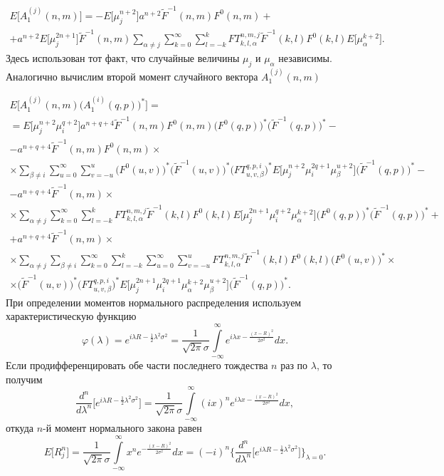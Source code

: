 \begin{multline}
E\bigg[A_1^{(j)}(n,m)\bigg]=-E\Big[\mu_j^{n+2}\Big] a^{n+2} \tilde F^{-1}(n,m)F^0(n,m)+ \\
+a^{n+2}E\Big[\mu_j^{2n+1}\Big]\tilde F^{-1}(n,m)\sum_{\alpha\neq j}\sum_{k=0}^\infty\sum_{l=-k}^k FT_{k,l,\alpha}^{n,m,j}\tilde F^{-1}(k,l)F^0(k,l)E\Big[\mu_\alpha^{k+2}\Big].
\label{eq:13:60}
\end{multline}
Здесь использован тот факт, что случайные величины $\mu_j$ и $\mu_\alpha$ независимы. Аналогично вычислим второй момент случайного вектора $A_1^{(j)}(n,m)$

\begin{multline}
E\bigg[A_1^{(j)}(n,m)\Big(A_1^{(i)}(q,p)\Big)^*\bigg]= \\
=E\Big[\mu_j^{n+2}\mu_i^{q+2}\Big] a^{n+q+4} \tilde F^{-1}(n,m)F^0(n,m)\Big(F^0(q,p)\Big)^*\Big(\tilde F^{-1}(q,p)\Big)^*- \\
-a^{n+q+4}\tilde F^{-1}(n,m)F^0(n,m)\times \\
\times\sum_{\beta\neq i}\sum_{u=0}^\infty\sum_{v=-u}^u \Big(F^0(u,v)\Big)^*\Big(\tilde F^{-1}(u,v)\Big)^*\Big(FT_{u,v,\beta}^{q,p,i}\Big)^*E\Big[\mu_j^{n+2}\mu_i^{2q+1}\mu_\beta^{u+2}\Big]\Big(\tilde F^{-1}(q,p)\Big)^*- \\
-a^{n+q+4}\tilde F^{-1}(n,m)\times \\
\times\sum_{\alpha\neq j}\sum_{k=0}^\infty\sum_{l=-k}^k FT_{k,l,\alpha}^{n,m,j}\tilde F^{-1}(k,l)F^0(k,l)E\Big[\mu_j^{2n+1}\mu_i^{q+2}\mu_\alpha^{k+2}\Big]\Big(F^0(q,p)\Big)^*\Big(\tilde F^{-1}(q,p)\Big)^*+ \\
+a^{n+q+4}\tilde F^{-1}(n,m)\times \\
\times\sum_{\alpha\neq j}\sum_{\beta\neq i}\sum_{k=0}^\infty\sum_{l=-k}^k\sum_{u=0}^\infty\sum_{v=-u}^u FT_{k,l,\alpha}^{n,m,j}\tilde F^{-1}(k,l)F^0(k,l)\Big(F^0(u,v)\Big)^*\times \\
\times\Big(\tilde F^{-1}(u,v)\Big)^*\Big(FT_{u,v,\beta}^{q,p,i}\Big)^*E\Big[\mu_j^{2n+1}\mu_i^{2q+1}\mu_\alpha^{k+2}\mu_\beta^{u+2}\Big]\Big(\tilde F^{-1}(q,p)\Big)^*.
\label{eq:13:61}
\end{multline}
При определении моментов нормального распределения используем характеристическую функцию
$$
\varphi(\lambda)=e^{i\lambda R-\frac{1}{2}\lambda^2\sigma^2}=\frac{1}{\sqrt{2\pi}\sigma}\int\limits_{-\infty}^\infty e^{i\lambda x-\frac{(x-R)^2}{2\sigma^2}}dx.
$$
Если продифференцировать обе части последнего тождества $n$ раз по $\lambda$, то получим
$$
\frac{d^n}{d\lambda^n}\bigg[e^{i\lambda R-\frac{1}{2}\lambda^2\sigma^2}\bigg]=\frac{1}{\sqrt{2\pi}\sigma}\int\limits_{-\infty}^\infty (ix)^n e^{i\lambda x-\frac{(x-R)^2}{2\sigma^2}}dx,
$$
откуда $n$-й момент нормального закона равен
$$
E\Big[R_j^n\Big]=\frac{1}{\sqrt{2\pi}\sigma}\int\limits_{-\infty}^\infty x^n e^{-\frac{(x-R)^2}{2\sigma^2}}dx=(-i)^n\bigg\{\frac{d^n}{d\lambda^n}\bigg[e^{i\lambda R-\frac{1}{2}\lambda^2\sigma^2}\bigg]\bigg\}_{\lambda=0}.
$$


